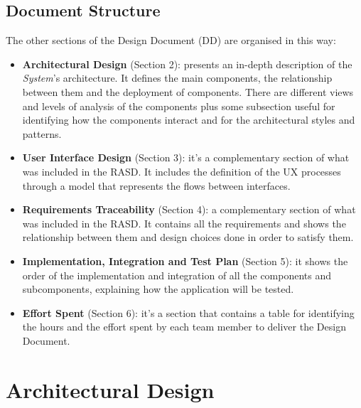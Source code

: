 \documentclass{article}
\begin{document}
		\pagebreak
	
		\subsection{Document Structure}
		The other sections of the Design Document (DD) are organised in this way:
			\begin{itemize}
				\item {\bf Architectural Design} (Section 2): presents an in-depth description of the {\it System}'s architecture. It defines the main components, the relationship between them and the deployment of components. There are different views and levels of analysis of the components plus some subsection useful for identifying how the components interact and for the architectural styles and patterns. 
				\item {\bf User Interface Design} (Section 3): it's a complementary section of what was included in the RASD. It includes the definition of the UX processes through a model that represents the flows between interfaces. 
				\item {\bf Requirements Traceability} (Section 4): a complementary section of what was included in the RASD. It contains all the requirements and shows the relationship between them and design choices done in order to satisfy them. 
				\item {\bf Implementation, Integration and Test Plan} (Section 5): it shows the order of the implementation and integration of all the components and subcomponents, explaining how the application will be tested.
				\item {\bf Effort Spent} (Section 6): it's a section that contains a table for identifying the hours and the effort spent by each team member to deliver the Design Document.
			\end{itemize}
		
		\pagebreak
	
	
\section{Architectural Design}
\end{document}
